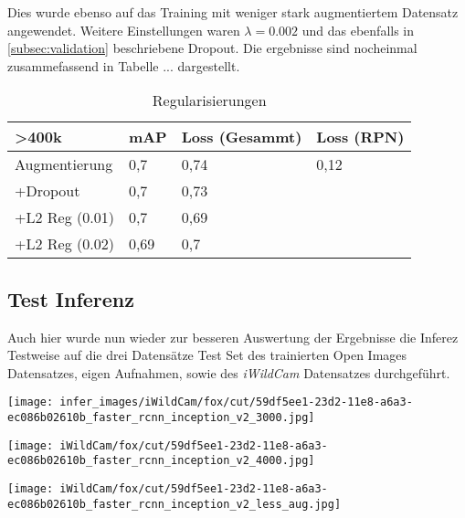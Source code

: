 \vspace{1cm}

Dies wurde ebenso auf das Training mit weniger stark augmentiertem Datensatz
angewendet. Weitere Einstellungen waren $\lambda = 0.002$ und das 
ebenfalls in \ref{subsec:validation} beschriebene Dropout.
Die ergebnisse sind nocheinmal zusammefassend in Tabelle ... dargestellt.


\begin{table}[htb]
  \centering
  \label{table:reg}
  \begin{tabular}{m{}|m{}<{\centering}m{}<{\centering}m{}<{\centering}}
  \hline
  \textgreater 400k & mAP  & Loss (Gesammt) & Loss (RPN) \\ \hline\hline
  Augmentierung     & 0,7  & 0,74           &  0,12          \\
  +Dropout          & 0,7  & 0,73           &            \\
  +L2 Reg (0.01)    & 0,7  & 0,69           &            \\
  +L2 Reg (0.02)    & 0,69 & 0,7            &            \\ \hline
  \end{tabular}
  \caption{Regularisierungen}
\end{table}


\subsection{Test Inferenz}

Auch hier wurde nun wieder zur besseren Auswertung der Ergebnisse die 
Inferez Testweise auf die drei Datensätze Test Set des trainierten Open Images
Datensatzes, eigen Aufnahmen, sowie des \textit{iWildCam} Datensatzes durchgeführt.

\begin{minipage}{0.333\textwidth}
  \centering
  \label{}
  \texttt{[image: infer\_images/iWildCam/fox/cut/59df5ee1-23d2-11e8-a6a3-ec086b02610b\_faster\_rcnn\_inception\_v2\_3000.jpg]}
\end{minipage}
\begin{minipage}{0.333\textwidth}
  \centering
  \label{}
  \texttt{[image: iWildCam/fox/cut/59df5ee1-23d2-11e8-a6a3-ec086b02610b\_faster\_rcnn\_inception\_v2\_4000.jpg]}
\end{minipage}
\begin{minipage}{0.333\textwidth}
  \centering
  \label{}
  \texttt{[image: iWildCam/fox/cut/59df5ee1-23d2-11e8-a6a3-ec086b02610b\_faster\_rcnn\_inception\_v2\_less\_aug.jpg]}
\end{minipage}

